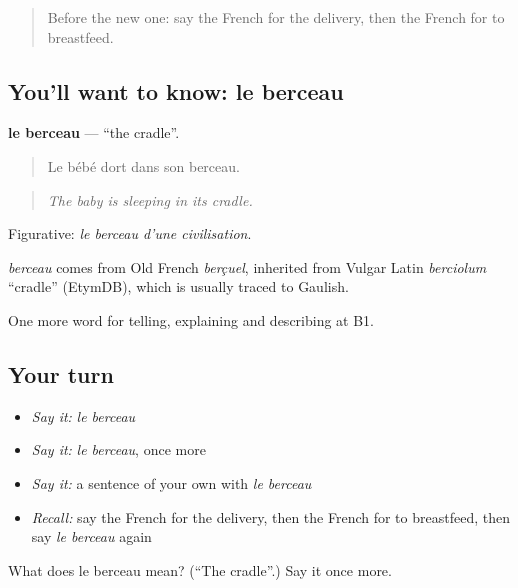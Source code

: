 \label{lesson:FR-C308-berceau}



\begin{quote}
Before the new one: say the French for the delivery, then the French for to breastfeed.
\end{quote}

\subsection*{You'll want to know: le berceau}
\textbf{le berceau} — \textquotedblleft{}the cradle\textquotedblright{}.

\begin{quote}
Le bébé dort dans son berceau.
\end{quote}

\begin{quote}
\emph{The baby is sleeping in its cradle.}
\end{quote}

Figurative: \emph{le berceau d'une civilisation}.

\begin{cousinweb}
\emph{berceau} comes from Old French \emph{berçuel}, inherited from Vulgar Latin \emph{berciolum} \textquotedblleft{}cradle\textquotedblright{} (EtymDB), which is usually traced to Gaulish.
\end{cousinweb}

\begin{grammarlens}[title={What you've built}]
One more word for telling, explaining and describing at B1.
\end{grammarlens}

\subsection*{Your turn}
\begin{itemize}
\raggedright
  \item \emph{Say it:} \emph{le berceau}
  \item \emph{Say it:} \emph{le berceau}, once more
  \item \emph{Say it:} a sentence of your own with \emph{le berceau}
  \item \emph{Recall:} say the French for the delivery, then the French for to breastfeed, then say \emph{le berceau} again
\end{itemize}

\begin{tcolorbox}[breakable,colback=teal!4,colframe=teal!35!black,title={Before you move on}]
What does le berceau mean? (\textquotedblleft{}The cradle\textquotedblright{}.) Say it once more.
\end{tcolorbox}
